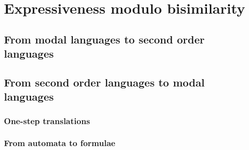 \documentclass[prodmode,acmtecs]{acmsmall} %
\begin{document}



\clearpage

\section{Expressiveness modulo bisimilarity}\label{sec:expresso}

\subsection{From modal languages to second order languages}

\subsection{From second order languages to modal languages}



\subsubsection{One-step translations}\label{pinvariant-fragment}


\subsubsection{From automata to formulae}\label{aut-to-formula}


\clearpage






\end{document}
